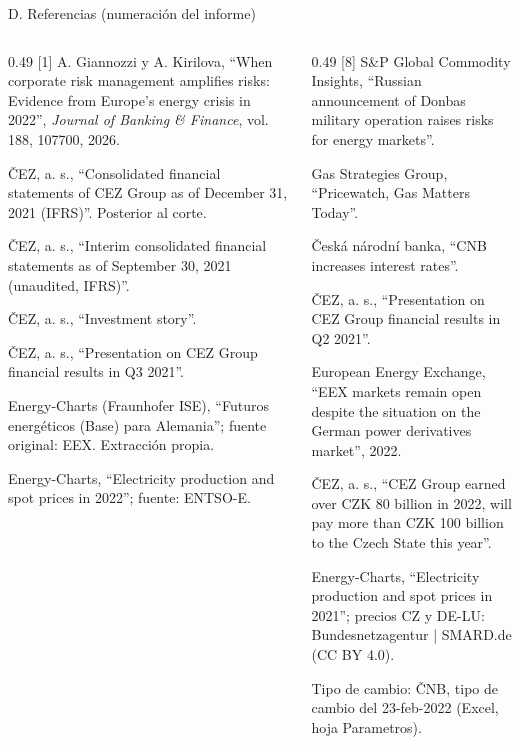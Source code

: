 \documentclass[aspectratio=169,11pt]{beamer}
\begin{document}
\begin{frame}[t]{D. Referencias (numeración del informe)}
  \tiny
  \setlength{\parskip}{0.6mm}
  \begin{columns}[T]
    \begin{column}{0.49\textwidth}
      [1] A. Giannozzi y A. Kirilova, ``When corporate risk management amplifies risks: Evidence from Europe's energy crisis in 2022'', \emph{Journal of Banking \& Finance}, vol. 188, 107700, 2026.\par
      [2] \v{C}EZ, a. s., ``Consolidated financial statements of CEZ Group as of December 31, 2021 (IFRS)''. Posterior al corte.\par
      [3] \v{C}EZ, a. s., ``Interim consolidated financial statements as of September 30, 2021 (unaudited, IFRS)''.\par
      [4] \v{C}EZ, a. s., ``Investment story''.\par
      [5] \v{C}EZ, a. s., ``Presentation on CEZ Group financial results in Q3 2021''.\par
      [6] Energy-Charts (Fraunhofer ISE), ``Futuros energéticos (Base) para Alemania''; fuente original: EEX. Extracción propia.\par
      [7] Energy-Charts, ``Electricity production and spot prices in 2022''; fuente: ENTSO-E.\par
    \end{column}
    \begin{column}{0.49\textwidth}
      [8] S\&P Global Commodity Insights, ``Russian announcement of Donbas military operation raises risks for energy markets''.\par
      [9] Gas Strategies Group, ``Pricewatch, Gas Matters Today''.\par
      [10] Česká národní banka, ``CNB increases interest rates''.\par
      [11] \v{C}EZ, a. s., ``Presentation on CEZ Group financial results in Q2 2021''.\par
      [13] European Energy Exchange, ``EEX markets remain open despite the situation on the German power derivatives market'', 2022.\par
      [14] \v{C}EZ, a. s., ``CEZ Group earned over CZK 80 billion in 2022, will pay more than CZK 100 billion to the Czech State this year''.\par
      [15] Energy-Charts, ``Electricity production and spot prices in 2021''; precios CZ y DE-LU: Bundesnetzagentur | SMARD.de (CC BY 4.0).\par
      Tipo de cambio: ČNB, tipo de cambio del 23-feb-2022 (Excel, hoja Parametros).
    \end{column}
  \end{columns}
\end{frame}
\end{document}
